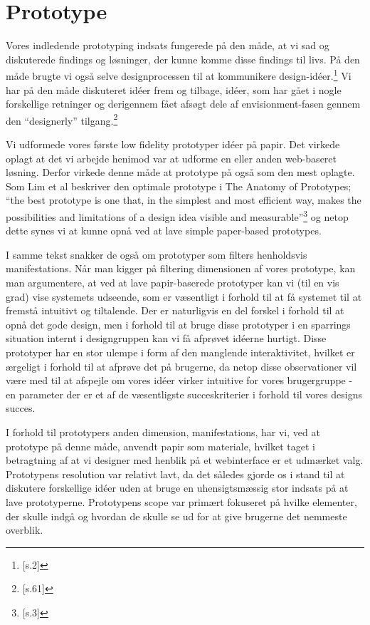 \section{Prototype}
Vores indledende prototyping indsats fungerede på den måde, at vi sad og diskuterede findings og løsninger, der kunne komme disse findings til livs. På den måde brugte vi også selve designprocessen til at kommunikere design-idéer.\footnote{\citep{Lim}[s.2]} Vi har på den måde diskuteret idéer frem og tilbage, idéer, som har gået i nogle forskellige retninger og derigennem fået afsøgt dele af envisionment-fasen gennem den “designerly” tilgang.\footnote{\citep{Stolterman}[s.61]}

Vi udformede vores første low fidelity prototyper idéer på papir. Det virkede oplagt at det vi arbejde henimod var at udforme en eller anden web-baseret løsning. Derfor virkede denne måde at prototype på også som den mest oplagte. Som Lim et al beskriver den optimale prototype i The Anatomy of Prototypes; “the best prototype is one that, in the simplest and most efficient way, makes the possibilities and limitations of a design idea visible and measurable”\footnote{\citep{Lim}[s.3]} og netop dette synes vi at kunne opnå ved at lave simple paper-based prototypes. 

I samme tekst snakker de også om prototyper som filters henholdsvis manifestations. Når man kigger på filtering dimensionen af vores prototype, kan man argumentere, at ved at lave papir-baserede prototyper kan vi (til en vis grad) vise systemets udseende, som er væsentligt i forhold til at få systemet til at fremstå intuitivt og tiltalende. Der er naturligvis en del forskel i forhold til at opnå det gode design, men i forhold til at bruge disse prototyper i en sparrings situation internt i designgruppen kan vi få  afprøvet idéerne hurtigt. Disse prototyper har en stor ulempe i form af den manglende interaktivitet, hvilket er ærgeligt i forhold til at afprøve det på brugerne, da netop disse observationer vil være med til at afspejle om vores idéer virker intuitive for vores brugergruppe - en parameter der er et af de væsentligste succeskriterier i forhold til vores designs succes.

I forhold til prototypers anden dimension, manifestations, har vi, ved at prototype på denne måde, anvendt papir som materiale, hvilket taget i betragtning af at vi designer med henblik på et webinterface er et udmærket valg. Prototypens resolution var relativt lavt, da det således gjorde os i stand til at diskutere forskellige idéer uden at bruge en uhensigtsmæssig stor indsats på at lave prototyperne. Prototypens scope var primært fokuseret på hvilke elementer, der skulle indgå og hvordan de skulle se ud for at give brugerne det nemmeste overblik.

